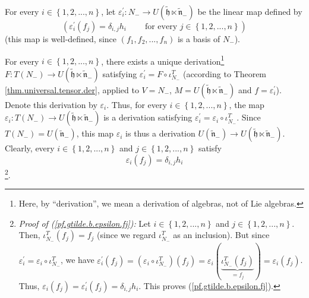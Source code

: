 \documentclass[etingof-lie.tex]{subfiles}
\begin{document}
\begin{verlong}
For every $i\in\left\{  1,2,...,n\right\}  $, let $\varepsilon_{i}^{\prime
}:N_{-}\rightarrow U\left(  \widetilde{\mathfrak{h}}\ltimes
\widetilde{\mathfrak{n}}_{-}\right)  $ be the linear map defined by%
\[
\left(  \varepsilon_{i}^{\prime}\left(  f_{j}\right)  =\delta_{i,j}%
h_{i}\ \ \ \ \ \ \ \ \ \ \text{for every }j\in\left\{  1,2,...,n\right\}
\right)
\]
(this map is well-defined, since $\left(  f_{1},f_{2},...,f_{n}\right)  $ is a
basis of $N_{-}$).

For every $i\in\left\{  1,2,...,n\right\}  $, there exists a unique
derivation\footnote{Here, by ``derivation'', we mean a derivation of algebras,
not of Lie algebras.} $F:T\left(  N_{-}\right)  \rightarrow U\left(
\widetilde{\mathfrak{h}}\ltimes\widetilde{\mathfrak{n}}_{-}\right)  $
satisfying $\varepsilon_{i}^{\prime}=F\circ\iota_{N_{-}}^{T}$ (according to
Theorem \ref{thm.universal.tensor.der}, applied to $V=N_{-}$, $M=U\left(
\widetilde{\mathfrak{h}}\ltimes\widetilde{\mathfrak{n}}_{-}\right)  $ and
$f=\varepsilon_{i}^{\prime}$). Denote this derivation by $\varepsilon_{i}$.
Thus, for every $i\in\left\{  1,2,...,n\right\}  $, the map $\varepsilon
_{i}:T\left(  N_{-}\right)  \rightarrow U\left(  \widetilde{\mathfrak{h}%
}\ltimes\widetilde{\mathfrak{n}}_{-}\right)  $ is a derivation satisfying
$\varepsilon_{i}^{\prime}=\varepsilon_{i}\circ\iota_{N_{-}}^{T}$. Since
$T\left(  N_{-}\right)  =U\left(  \widetilde{\mathfrak{n}}_{-}\right)  $, this
map $\varepsilon_{i}$ is thus a derivation $U\left(  \widetilde{\mathfrak{n}%
}_{-}\right)  \rightarrow U\left(  \widetilde{\mathfrak{h}}\ltimes
\widetilde{\mathfrak{n}}_{-}\right)  $. Clearly, every $i\in\left\{
1,2,...,n\right\}  $ and $j\in\left\{  1,2,...,n\right\}  $ satisfy%
\begin{equation}
\varepsilon_{i}\left(  f_{j}\right)  =\delta_{i,j}h_{i}
\label{pf.gtilde.b.epsilon.fj}%
\end{equation}
\footnote{\textit{Proof of (\ref{pf.gtilde.b.epsilon.fj}):} Let $i\in\left\{
1,2,...,n\right\}  $ and $j\in\left\{  1,2,...,n\right\}  $. Then,
$\iota_{N_{-}}^{T}\left(  f_{j}\right)  =f_{j}$ (since we regard $\iota
_{N_{-}}^{T}$ as an inclusion). But since $\varepsilon_{i}^{\prime
}=\varepsilon_{i}\circ\iota_{N_{-}}^{T}$, we have $\varepsilon_{i}^{\prime
}\left(  f_{j}\right)  =\left(  \varepsilon_{i}\circ\iota_{N_{-}}^{T}\right)
\left(  f_{j}\right)  =\varepsilon_{i}\left(  \underbrace{\iota_{N_{-}}%
^{T}\left(  f_{j}\right)  }_{=f_{j}}\right)  =\varepsilon_{i}\left(
f_{j}\right)  $. Thus, $\varepsilon_{i}\left(  f_{j}\right)  =\varepsilon
_{i}^{\prime}\left(  f_{j}\right)  =\delta_{i,j}h_{i}$. This proves
(\ref{pf.gtilde.b.epsilon.fj}).}.
\end{verlong}
\end{document}
